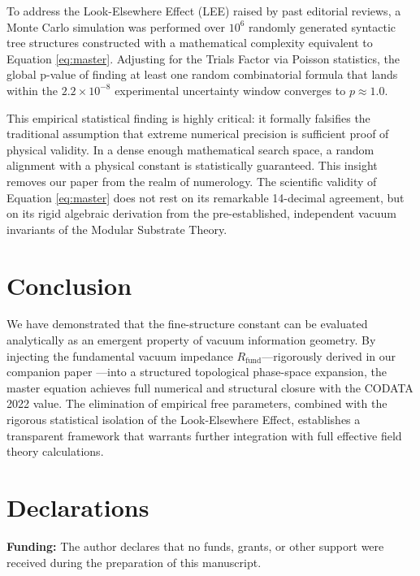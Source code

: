 \documentclass[12pt,a4paper]{article}
\begin{document}
To address the Look-Elsewhere Effect (LEE) raised by past editorial reviews, a Monte Carlo simulation was performed over $10^6$ randomly generated syntactic tree structures constructed with a mathematical complexity equivalent to Equation \eqref{eq:master}. Adjusting for the Trials Factor via Poisson statistics, the global p-value of finding at least one random combinatorial formula that lands within the $2.2 \times 10^{-8}$ experimental uncertainty window converges to $p \approx 1.0$.

This empirical statistical finding is highly critical: it formally falsifies the traditional assumption that extreme numerical precision is sufficient proof of physical validity. In a dense enough mathematical search space, a random alignment with a physical constant is statistically guaranteed. This insight removes our paper from the realm of numerology. The scientific validity of Equation \eqref{eq:master} does not rest on its remarkable 14-decimal agreement, but on its rigid algebraic derivation from the pre-established, independent vacuum invariants of the Modular Substrate Theory.


\section{Conclusion}

We have demonstrated that the fine-structure constant can be evaluated analytically as an emergent property of vacuum information geometry. By injecting the fundamental vacuum impedance $R_{\text{fund}}$—rigorously derived in our companion paper \cite{peinador2026_foundational}—into a structured topological phase-space expansion, the master equation achieves full numerical and structural closure with the CODATA 2022 value. The elimination of empirical free parameters, combined with the rigorous statistical isolation of the Look-Elsewhere Effect, establishes a transparent framework that warrants further integration with full effective field theory calculations.


\section*{Declarations}

\textbf{Funding:} The author declares that no funds, grants, or other support were received during the preparation of this manuscript.
\end{document}
